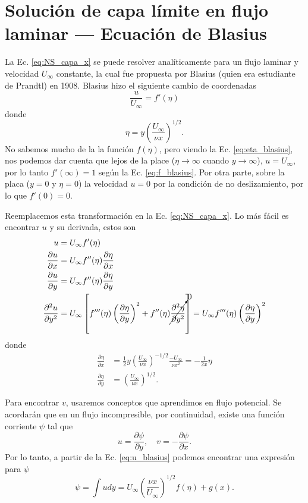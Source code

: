 \section*{Solución de capa límite en flujo laminar --- Ecuación de Blasius}
La Ec. \eqref{eq:NS_capa_x} se puede resolver analíticamente para un flujo laminar y velocidad $U_\infty$ constante, la cual fue propuesta por Blasius (quien era estudiante de Prandtl) en 1908.
Blasius hizo el siguiente cambio de coordenadas
%
\begin{equation}\label{eq:f_blasius}
\frac{u}{U_\infty} = f'(\eta)
\end{equation}
%
donde 
%
\begin{equation}\label{eq:eta_blasius}
\eta = y\left(\frac{U_\infty}{\nu x}\right)^{1/2}.
\end{equation}
%
No sabemos mucho de la la función $f(\eta)$, pero viendo la Ec. \eqref{eq:eta_blasius}, nos podemos dar cuenta que lejos de la place ($\eta\to\infty$ cuando $y\to\infty$), $u=U_\infty$, por lo tanto $f'(\infty) = 1$ según la Ec. \eqref{eq:f_blasius}.
Por otra parte, sobre la placa ($y=0$ y $\eta=0$) la velocidad $u=0$ por la condición de no deslizamiento, por lo que $f'(0)=0$.

Reemplacemos esta transformación en la Ec. \eqref{eq:NS_capa_x}.
Lo más fácil es encontrar $u$ y su derivada, estos son
%
\begin{align}\label{eq:u_blasius}
u &= U_\infty f'(\eta) \nonumber\\
\frac{\partial u}{\partial x} &= U_\infty f''(\eta)\frac{\partial \eta}{\partial x}\nonumber\\
\frac{\partial u}{\partial y} &= U_\infty f''(\eta)\frac{\partial \eta}{\partial y}\nonumber\\
\frac{\partial^2 u}{\partial y^2} &= U_\infty \left[f'''(\eta)\left(\frac{\partial \eta}{\partial y}\right)^2 + f''(\eta)\cancelto{0}{\frac{\partial^2\eta}{\partial y^2}}\right] = U_\infty f'''(\eta)\left(\frac{\partial \eta}{\partial y}\right)^2
\end{align}
%
donde
%
\begin{align}\label{eq:deta_dx}
\frac{\partial \eta}{\partial x} &= \frac{1}{2}y\left(\frac{U_\infty}{\nu x}\right)^{-1/2} \frac{-U_\infty}{\nu x^2} = -\frac{1}{2x} \eta\nonumber\\
\frac{\partial \eta}{\partial y} &= \left(\frac{U_\infty}{\nu x}\right)^{1/2}.
\end{align}

Para encontrar $v$, usaremos conceptos que aprendimos en flujo potencial.
Se acordarán que en un flujo incompresible, por continuidad, existe una función corriente $\psi$ tal que
%
\begin{equation}
u=\frac{\partial\psi}{\partial y}, \quad v=-\frac{\partial\psi}{\partial x}.
\end{equation}
%
Por lo tanto, a partir de la Ec. \eqref{eq:u_blasius} podemos encontrar una expresión para $\psi$
%
\begin{equation}\label{eq:psi_1}
\psi = \int u dy = U_\infty \left(\frac{\nu x}{U_\infty}\right)^{1/2}f(\eta) + g(x).
\end{equation}

